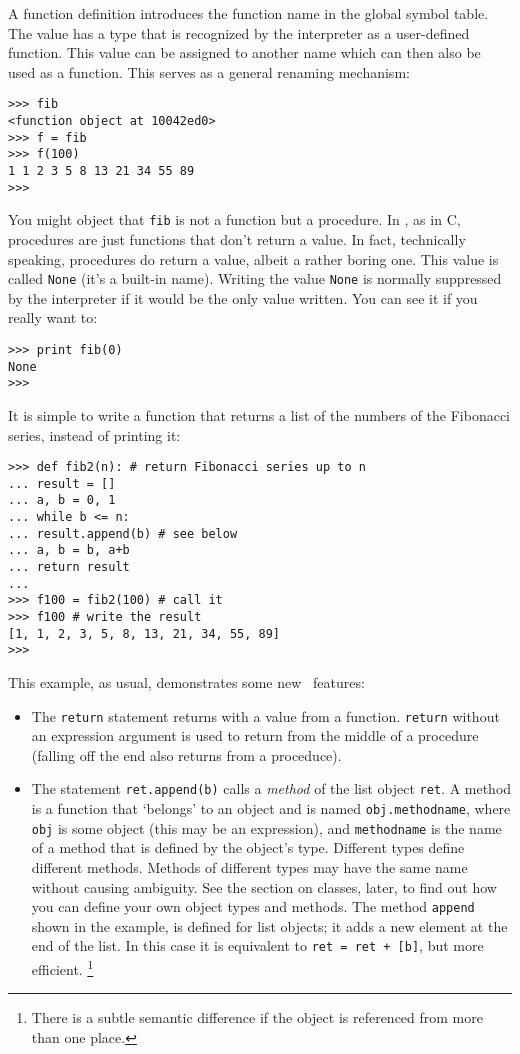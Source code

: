 A function definition introduces the function name in the global symbol
table.
The value has a type that is recognized by the interpreter as a
user-defined function.
This value can be assigned to another name which can then also be used
as a function.
This serves as a general renaming mechanism:
\bcode\begin{verbatim}
>>> fib
<function object at 10042ed0>
>>> f = fib
>>> f(100)
1 1 2 3 5 8 13 21 34 55 89
>>>
\end{verbatim}\ecode
You might object that
{\tt fib}
is not a function but a procedure.
In \Python, as in C, procedures are just functions that don't return a
value.
In fact, technically speaking, procedures do return a value, albeit a
rather boring one.
This value is called {\tt None} (it's a built-in name).
Writing the value {\tt None} is normally suppressed by the interpreter
if it would be the only value written.
You can see it if you really want to:
\bcode\begin{verbatim}
>>> print fib(0)
None
>>>
\end{verbatim}\ecode
It is simple to write a function that returns a list of the numbers of
the Fibonacci series, instead of printing it:
\bcode\begin{verbatim}
>>> def fib2(n): # return Fibonacci series up to n
... result = []
... a, b = 0, 1
... while b <= n:
... result.append(b) # see below
... a, b = b, a+b
... return result
...
>>> f100 = fib2(100) # call it
>>> f100 # write the result
[1, 1, 2, 3, 5, 8, 13, 21, 34, 55, 89]
>>>
\end{verbatim}\ecode
This example, as usual, demonstrates some new \Python\ features:
\begin{itemize}
\item
The
{\tt return}
statement returns with a value from a function.
{\tt return}
without an expression argument is used to return from the middle of a
procedure (falling off the end also returns from a proceduce).
\item
The statement
{\tt ret.append(b)}
calls a
{\em method}
of the list object
{\tt ret}.
A method is a function that `belongs' to an object and is named
{\tt obj.methodname},
where
{\tt obj}
is some object (this may be an expression), and
{\tt methodname}
is the name of a method that is defined by the object's type.
Different types define different methods.
Methods of different types may have the same name without causing
ambiguity.
See the section on classes, later, to find out how you can define your
own object types and methods.
The method
{\tt append}
shown in the example, is defined for list objects; it adds a new element
at the end of the list.
In this case it is equivalent to
{\tt ret = ret + [b]},
but more efficient.%
\footnote{
 There is a subtle semantic difference if the object
 is referenced from more than one place.
}
\end{itemize}
